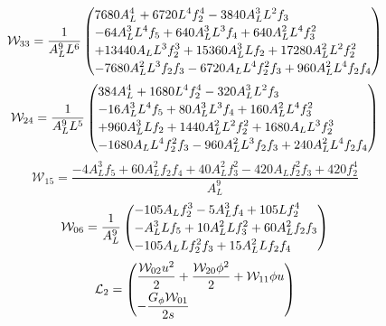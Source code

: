 \documentclass[11pt,a4paper]{article}
\begin{document}
\begin{equation}
\mathcal W_{33}=\frac{1}{A_{L}^{9} L^{6}}\left(\vcenter{\hbox{\shortstack[l]{$\displaystyle 7680 A_{L}^{4} + 6720 L^{4} f_{2}^{4} - 3840 A_{L}^{3} L^{2} f_{3}$\\
$\displaystyle - 64 A_{L}^{3} L^{4} f_{5} + 640 A_{L}^{3} L^{3} f_{4} + 640 A_{L}^{2} L^{4} f_{3}^{2}$\\
$\displaystyle + 13440 A_{L} L^{3} f_{2}^{3} + 15360 A_{L}^{3} L f_{2} + 17280 A_{L}^{2} L^{2} f_{2}^{2}$\\
$\displaystyle - 7680 A_{L}^{2} L^{3} f_{2} f_{3} - 6720 A_{L} L^{4} f_{2}^{2} f_{3} + 960 A_{L}^{2} L^{4} f_{2} f_{4}$}}}\right)
\label{eq:cat-local-W-3-3}
\end{equation}
\begin{equation}
\mathcal W_{24}=\frac{1}{A_{L}^{9} L^{5}}\left(\vcenter{\hbox{\shortstack[l]{$\displaystyle 384 A_{L}^{4} + 1680 L^{4} f_{2}^{4} - 320 A_{L}^{3} L^{2} f_{3}$\\
$\displaystyle - 16 A_{L}^{3} L^{4} f_{5} + 80 A_{L}^{3} L^{3} f_{4} + 160 A_{L}^{2} L^{4} f_{3}^{2}$\\
$\displaystyle + 960 A_{L}^{3} L f_{2} + 1440 A_{L}^{2} L^{2} f_{2}^{2} + 1680 A_{L} L^{3} f_{2}^{3}$\\
$\displaystyle - 1680 A_{L} L^{4} f_{2}^{2} f_{3} - 960 A_{L}^{2} L^{3} f_{2} f_{3} + 240 A_{L}^{2} L^{4} f_{2} f_{4}$}}}\right)
\label{eq:cat-local-W-2-4}
\end{equation}
\begin{equation}
\mathcal W_{15}=\frac{- 4 A_{L}^{3} f_{5} + 60 A_{L}^{2} f_{2} f_{4} + 40 A_{L}^{2} f_{3}^{2} - 420 A_{L} f_{2}^{2} f_{3} + 420 f_{2}^{4}}{A_{L}^{9}}
\label{eq:cat-local-W-1-5}
\end{equation}
\begin{equation}
\mathcal W_{06}=\frac{1}{A_{L}^{9}}\left(\vcenter{\hbox{\shortstack[l]{$\displaystyle - 105 A_{L} f_{2}^{3} - 5 A_{L}^{3} f_{4} + 105 L f_{2}^{4}$\\
$\displaystyle - A_{L}^{3} L f_{5} + 10 A_{L}^{2} L f_{3}^{2} + 60 A_{L}^{2} f_{2} f_{3}$\\
$\displaystyle - 105 A_{L} L f_{2}^{2} f_{3} + 15 A_{L}^{2} L f_{2} f_{4}$}}}\right)
\label{eq:cat-local-W-0-6}
\end{equation}
\begin{equation}
\mathcal L_{2}=\left(\vcenter{\hbox{\shortstack[l]{$\displaystyle \frac{\mathcal W_{02} u^{2}}{2} + \frac{\mathcal W_{20} \phi^{2}}{2} + \mathcal W_{11} \phi u$\\
$\displaystyle - \frac{G_{\phi} \mathcal W_{01}}{2 s}$}}}\right)
\label{eq:cat-local-L-2}
\end{equation}
\end{document}
